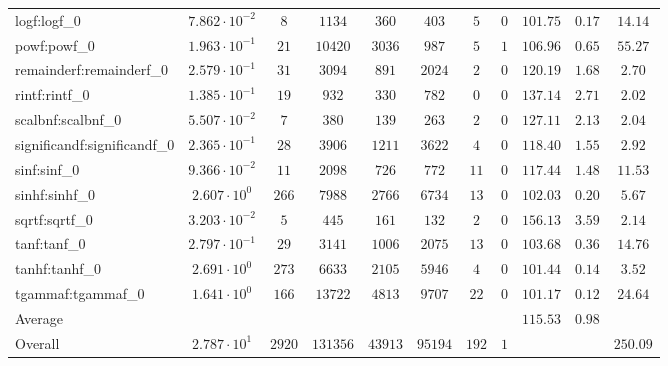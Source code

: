\begin{tabular}{|l|c|c|c|c|c|c|c|c|c|c|}
logf:logf\_0                 & $ 7.862 \cdot 10^{-2} $ & $ 8      $ & $ 1134   $ & $ 360   $ & $ 403   $ & $ 5   $ & $ 0 $ & $ 101.75      $ & $ 0.17    $ & $ 14.14   $ \\
powf:powf\_0                 & $ 1.963 \cdot 10^{-1} $ & $ 21     $ & $ 10420  $ & $ 3036  $ & $ 987   $ & $ 5   $ & $ 1 $ & $ 106.96      $ & $ 0.65    $ & $ 55.27   $ \\
remainderf:remainderf\_0     & $ 2.579 \cdot 10^{-1} $ & $ 31     $ & $ 3094   $ & $ 891   $ & $ 2024  $ & $ 2   $ & $ 0 $ & $ 120.19      $ & $ 1.68    $ & $ 2.70    $ \\
rintf:rintf\_0               & $ 1.385 \cdot 10^{-1} $ & $ 19     $ & $ 932    $ & $ 330   $ & $ 782   $ & $ 0   $ & $ 0 $ & $ 137.14      $ & $ 2.71    $ & $ 2.02    $ \\
scalbnf:scalbnf\_0           & $ 5.507 \cdot 10^{-2} $ & $ 7      $ & $ 380    $ & $ 139   $ & $ 263   $ & $ 2   $ & $ 0 $ & $ 127.11      $ & $ 2.13    $ & $ 2.04    $ \\
significandf:significandf\_0 & $ 2.365 \cdot 10^{-1} $ & $ 28     $ & $ 3906   $ & $ 1211  $ & $ 3622  $ & $ 4   $ & $ 0 $ & $ 118.40      $ & $ 1.55    $ & $ 2.92    $ \\
sinf:sinf\_0                 & $ 9.366 \cdot 10^{-2} $ & $ 11     $ & $ 2098   $ & $ 726   $ & $ 772   $ & $ 11  $ & $ 0 $ & $ 117.44      $ & $ 1.48    $ & $ 11.53   $ \\
sinhf:sinhf\_0               & $ 2.607 \cdot 10^{0}  $ & $ 266    $ & $ 7988   $ & $ 2766  $ & $ 6734  $ & $ 13  $ & $ 0 $ & $ 102.03      $ & $ 0.20    $ & $ 5.67    $ \\
sqrtf:sqrtf\_0               & $ 3.203 \cdot 10^{-2} $ & $ 5      $ & $ 445    $ & $ 161   $ & $ 132   $ & $ 2   $ & $ 0 $ & $ 156.13      $ & $ 3.59    $ & $ 2.14    $ \\
tanf:tanf\_0                 & $ 2.797 \cdot 10^{-1} $ & $ 29     $ & $ 3141   $ & $ 1006  $ & $ 2075  $ & $ 13  $ & $ 0 $ & $ 103.68      $ & $ 0.36    $ & $ 14.76   $ \\
tanhf:tanhf\_0               & $ 2.691 \cdot 10^{0}  $ & $ 273    $ & $ 6633   $ & $ 2105  $ & $ 5946  $ & $ 4   $ & $ 0 $ & $ 101.44      $ & $ 0.14    $ & $ 3.52    $ \\
tgammaf:tgammaf\_0           & $ 1.641 \cdot 10^{0}  $ & $ 166    $ & $ 13722  $ & $ 4813  $ & $ 9707  $ & $ 22  $ & $ 0 $ & $ 101.17      $ & $ 0.12    $ & $ 24.64   $ \\
\hline
Average                      & $                     $ & $        $ & $        $ & $       $ & $       $ & $     $ & $   $ & $ 115.53      $ & $ 0.98    $ & $         $ \\
\hline
Overall                      & $ 2.787 \cdot 10^{1}  $ & $ 2920   $ & $ 131356 $ & $ 43913 $ & $ 95194 $ & $ 192 $ & $ 1 $ & $             $ & $         $ & $ 250.09  $ \\
\hline
\end{tabular}
